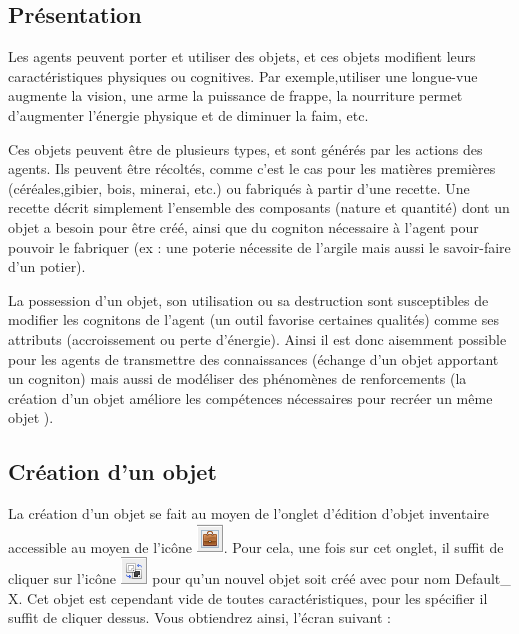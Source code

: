 \subsection{Présentation}

Les agents peuvent porter et utiliser des objets, et ces objets modifient leurs caractéristiques physiques ou cognitives. Par exemple,utiliser une longue-vue augmente la vision, une arme la puissance de frappe, la nourriture permet d’augmenter l’énergie physique et de diminuer la faim, etc. 

Ces objets peuvent être de plusieurs types, et sont générés par les actions des agents. Ils peuvent être récoltés, comme c’est le cas pour les matières premières (céréales,gibier, bois, minerai, etc.) ou fabriqués à partir d’une recette. Une recette décrit simplement l’ensemble des composants (nature et quantité) dont un objet a besoin pour être créé, ainsi que du cogniton nécessaire à l’agent pour pouvoir le fabriquer (ex : une poterie nécessite de l’argile mais aussi le savoir-faire d’un potier).

La possession d’un objet, son utilisation ou sa destruction sont susceptibles de modifier les cognitons de l’agent (un outil favorise certaines qualités) comme ses attributs (accroissement ou perte d’énergie). Ainsi il est donc aisemment possible pour les agents de transmettre des connaissances (échange d'un objet apportant un cogniton) mais aussi de modéliser des phénomènes de renforcements (la création d'un objet améliore les compétences nécessaires pour recréer un même objet ).

\subsection{Création d'un objet}

La création d'un objet se fait au moyen de l'onglet d'édition d'objet inventaire accessible au moyen de l'icône \includegraphics{images/item.png}.
Pour cela, une fois sur cet onglet, il suffit de cliquer sur l'icône \includegraphics{images/create.png} pour qu'un nouvel objet soit créé avec pour nom Default\_ X. Cet objet est cependant vide de toutes caractéristiques, pour les spécifier il suffit de cliquer dessus. Vous obtiendrez ainsi, l'écran suivant : \newline

